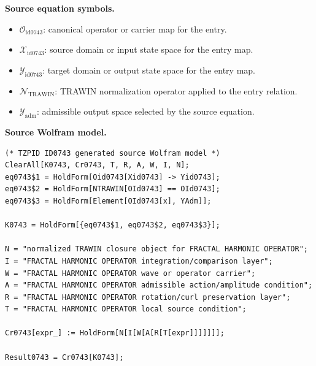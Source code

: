 \begin{minipage}[t]{0.49\linewidth}
\begingroup
\small
\raggedright
\textbf{Source equation symbols.}\par
\begin{itemize}[leftmargin=1.35em,itemsep=1pt,topsep=1pt,parsep=0pt]
    \item $\mathcal{O}_{\mathrm{id0743}}$: canonical operator or carrier map for the entry.
    \item $\mathcal{X}_{\mathrm{id0743}}$: source domain or input state space for the entry map.
    \item $\mathcal{Y}_{\mathrm{id0743}}$: target domain or output state space for the entry map.
    \item $\mathcal{N}_{\mathrm{TRAWIN}}$: TRAWIN normalization operator applied to the entry relation.
    \item $\mathcal{Y}_{\mathrm{adm}}$: admissible output space selected by the source equation.
\end{itemize}
\endgroup
\end{minipage}\hfill
\begin{minipage}[t]{0.47\linewidth}
\begingroup
\scriptsize
\raggedright
\textbf{Source Wolfram model.}\par
\begin{Verbatim}[fontsize=\tiny,breaklines=true,breakanywhere=true]
(* TZPID ID0743 generated source Wolfram model *)
ClearAll[K0743, Cr0743, T, R, A, W, I, N];
eq0743$1 = HoldForm[Oid0743[Xid0743] -> Yid0743];
eq0743$2 = HoldForm[NTRAWIN[OId0743] == OId0743];
eq0743$3 = HoldForm[Element[OId0743[x], YAdm]];

K0743 = HoldForm[{eq0743$1, eq0743$2, eq0743$3}];

N = "normalized TRAWIN closure object for FRACTAL HARMONIC OPERATOR";
I = "FRACTAL HARMONIC OPERATOR integration/comparison layer";
W = "FRACTAL HARMONIC OPERATOR wave or operator carrier";
A = "FRACTAL HARMONIC OPERATOR admissible action/amplitude condition";
R = "FRACTAL HARMONIC OPERATOR rotation/curl preservation layer";
T = "FRACTAL HARMONIC OPERATOR local source condition";

Cr0743[expr_] := HoldForm[N[I[W[A[R[T[expr]]]]]]];

Result0743 = Cr0743[K0743];
\end{Verbatim}
\endgroup
\end{minipage}

